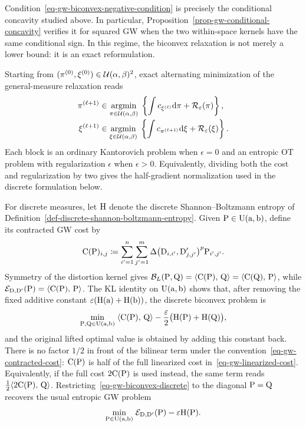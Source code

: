 Condition~\eqref{eq-gw-biconvex-negative-condition} is precisely the conditional concavity studied above. In particular, Proposition~\ref{prop-gw-conditional-concavity} verifies it for squared GW when the two within-space kernels have the same conditional sign. In this regime, the biconvex relaxation is not merely a lower bound: it is an exact reformulation.

Starting from $(\pi^{(0)},\xi^{(0)})\in\mathcal{U}(\alpha,\beta)^2$, exact alternating minimization of the general-measure relaxation reads
\begin{align}\label{eq-gw-biconvex-alternating-general}
	\pi^{(\ell+1)}
	&\in
	\underset{\pi\in\mathcal{U}(\alpha,\beta)}{\operatorname{argmin}}\;
	\left\{\int c_{\xi^{(\ell)}}\mathrm{d}\pi+\mathcal R_\varepsilon(\pi)\right\},
	\\[-.2em]
	\xi^{(\ell+1)}
	&\in
	\underset{\xi\in\mathcal{U}(\alpha,\beta)}{\operatorname{argmin}}\;
	\left\{\int c_{\pi^{(\ell+1)}}\mathrm{d}\xi+\mathcal R_\varepsilon(\xi)\right\}.
\end{align}
Each block is an ordinary Kantorovich problem when $\epsilon=0$ and an entropic OT problem with regularization $\epsilon$ when $\epsilon>0$. Equivalently, dividing both the cost and regularization by two gives the half-gradient normalization used in the discrete formulation below.

For discrete measures, let $\mathrm{H}$ denote the discrete Shannon--Boltzmann entropy of Definition~\ref{def-discrete-shannon-boltzmann-entropy}. Given $\mathrm{P}\in\mathrm{U}(\mathrm{a},\mathrm{b})$, define its contracted GW cost by
\begin{equation}\label{eq-gw-contracted-cost}
	\mathrm{C}(\mathrm{P})_{i,j}
	\coloneqq
	\sum_{i'=1}^{n}\sum_{j'=1}^{m}
	\Delta\bigl(\mathrm{D}_{i,i'},\mathrm{D}'_{j,j'}\bigr)^p
	\mathrm{P}_{i',j'}.
\end{equation}
Symmetry of the distortion kernel gives
$\mathcal B_L(\mathrm{P},\mathrm{Q})=\langle \mathrm{C}(\mathrm{P}),\,\mathrm{Q}\rangle
=\langle \mathrm{C}(\mathrm{Q}),\,\mathrm{P}\rangle$, while
$\mathcal{E}_{\mathrm{D},\mathrm{D}'}(\mathrm{P})=\langle \mathrm{C}(\mathrm{P}),\,\mathrm{P}\rangle$.
The KL identity on $\mathrm{U}(\mathrm{a},\mathrm{b})$ shows that, after removing the fixed additive constant $\varepsilon(\mathrm{H}(\mathrm{a})+\mathrm{H}(\mathrm{b}))$, the discrete biconvex problem is
\begin{equation}\label{eq-gw-biconvex-discrete}
	\underset{\mathrm{P},\mathrm{Q}\in\mathrm{U}(\mathrm{a},\mathrm{b})}{\min}\;
	\langle \mathrm{C}(\mathrm{P}),\,\mathrm{Q}\rangle
	-
	\frac{\varepsilon}{2}\bigl(\mathrm{H}(\mathrm{P})+\mathrm{H}(\mathrm{Q})\bigr),
\end{equation}
and the original lifted optimal value is obtained by adding this constant back. There is no factor $1/2$ in front of the bilinear term under the convention~\eqref{eq-gw-contracted-cost}: $\mathrm{C}(\mathrm{P})$ is half of the full linearized cost in~\eqref{eq-gw-linearized-cost}. Equivalently, if the full cost $2\mathrm{C}(\mathrm{P})$ is used instead, the same term reads $\frac12\langle 2\mathrm{C}(\mathrm{P}),\,\mathrm{Q}\rangle$. Restricting~\eqref{eq-gw-biconvex-discrete} to the diagonal $\mathrm{P}=\mathrm{Q}$ recovers the usual entropic GW problem
\begin{equation}\label{eq-gw-entropy}
	\underset{\mathrm{P}\in\mathrm{U}(\mathrm{a},\mathrm{b})}{\min}\;
	\mathcal{E}_{\mathrm{D},\mathrm{D}'}(\mathrm{P})-\varepsilon\mathrm{H}(\mathrm{P}).
\end{equation}

